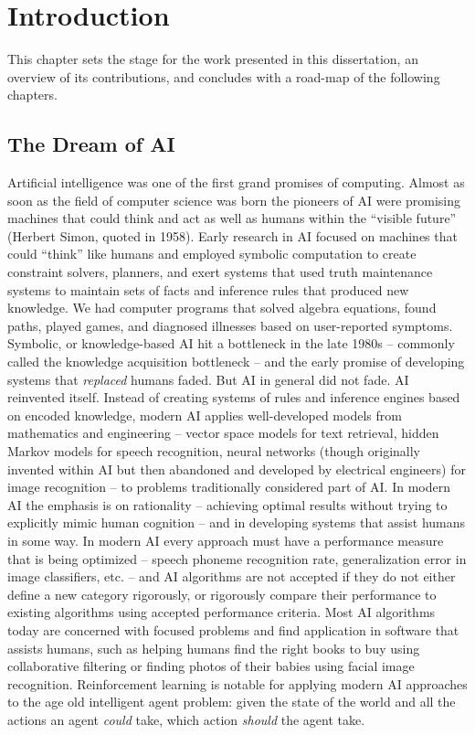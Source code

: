 \chapter{Introduction}

This chapter sets the stage for the work presented in this dissertation, an overview of its contributions, and concludes with a road-map of the following chapters.

\section{The Dream of AI}

Artificial intelligence was one of the first grand promises of computing. Almost as soon as the field of computer science was born the pioneers of AI were promising machines that could think and act as well as humans within the ``visible future'' (Herbert Simon, quoted in 1958). Early research in AI focused on machines that could ``think'' like humans and employed symbolic computation to create constraint solvers, planners, and exert systems that used truth maintenance systems to maintain sets of facts and inference rules that produced new knowledge. We had computer programs that solved algebra equations, found paths, played games, and diagnosed illnesses based on user-reported symptoms. Symbolic, or knowledge-based AI hit a bottleneck in the late 1980s -- commonly called the knowledge acquisition bottleneck -- and the early promise of developing systems that {\it replaced} humans faded. But AI in general did not fade. AI reinvented itself. Instead of creating systems of rules and inference engines based on encoded knowledge, modern AI applies well-developed models from mathematics and engineering -- vector space models for text retrieval, hidden Markov models for speech recognition, neural networks (though originally invented within AI but then abandoned and developed by electrical engineers) for image recognition -- to problems traditionally considered part of AI. In modern AI the emphasis is on rationality -- achieving optimal results without trying to explicitly mimic human cognition -- and in developing systems that assist humans in some way. In modern AI every approach must have a performance measure that is being optimized -- speech phoneme recognition rate, generalization error in image classifiers, etc. -- and AI algorithms are not accepted if they do not either define a new category rigorously, or rigorously compare their performance to existing algorithms using accepted performance criteria. Most AI algorithms today are concerned with focused problems and find application in software that assists humans, such as helping humans find the right books to buy using collaborative filtering or finding photos of their babies using facial image recognition.  Reinforcement learning is notable for applying modern AI approaches to the age old intelligent agent problem: given the state of the world and all the actions an agent {\it could} take, which action {\it should} the agent take.

